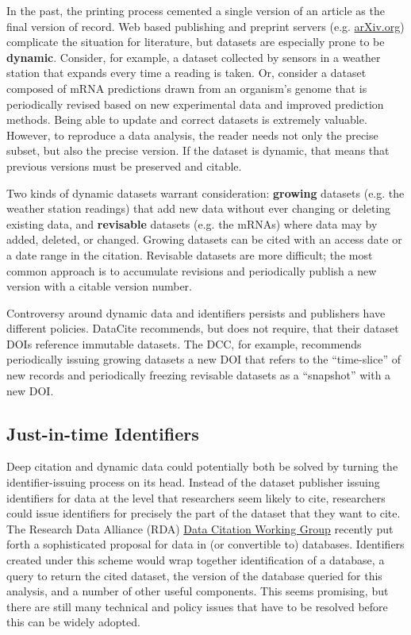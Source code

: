 \documentclass[10pt,twocolumn]{article}
\begin{document}
In the past, the printing process cemented a single version of an article as the final version of record.
Web based publishing and preprint servers (e.g. \href{http://arxiv.org/}{arXiv.org}) complicate the situation for literature, but datasets are especially prone to be \textbf{dynamic}.
Consider, for example, a dataset collected by sensors in a weather station that expands every time a reading is taken.
Or, consider a dataset composed of mRNA predictions drawn from an organism's genome that is periodically revised based on new experimental data and improved prediction methods.
Being able to update and correct datasets is extremely valuable.
However, to reproduce a data analysis, the reader needs not only the precise subset, but also the precise version.
If the dataset is dynamic, that means that previous versions must be preserved and citable.

Two kinds of dynamic datasets warrant consideration: \textbf{growing} datasets (e.g. the weather station readings) that add new data without ever changing or deleting existing data, and \textbf{revisable} datasets (e.g. the mRNAs) where data may by added, deleted, or changed.  %
Growing datasets can be cited with an access date or a date range in the citation.
Revisable datasets are more difficult; the most common approach is to accumulate revisions and periodically publish a new version with a citable version number.

Controversy around dynamic data and identifiers persists and publishers have different policies.
DataCite recommends, but does not require, that their dataset DOIs reference immutable datasets.
The DCC, for example, recommends periodically issuing growing datasets a new DOI that refers to the ``time-slice'' of new records and periodically freezing revisable datasets as a ``snapshot'' with a new DOI.

\subsection*{Just-in-time Identifiers}\label{just-in-time-identifiers}

Deep citation and dynamic data could potentially both be solved by turning the identifier-issuing process on its head.
Instead of the dataset publisher issuing identifiers for data at the level that researchers seem likely to cite, researchers could issue identifiers for precisely the part of the dataset that they want to cite.
The Research Data Alliance (RDA) \href{http://rd-alliance.org/working-groups/data-citation-wg.html}{Data Citation Working Group} recently put forth a sophisticated proposal for data in (or convertible to) databases.
Identifiers created under this scheme would wrap together identification of a database, a query to return the cited dataset, the version of the database queried for this analysis, and a number of other useful components.
This seems promising, but there are still many technical and policy issues that have to be resolved before this can be widely adopted.
\end{document}
